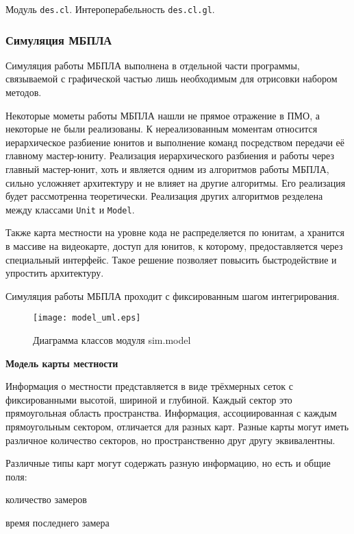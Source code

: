 Модуль \verb|des.cl|. Интероперабельность \verb|des.cl.gl|.

\newpage
\subsubsection{Симуляция МБПЛА}

Симуляция работы МБПЛА выполнена в отдельной части программы,
связываемой с графической частью лишь необходимым для отрисовки
набором методов.

Некоторые мометы работы МБПЛА нашли не прямое отражение в ПМО,
а некоторые не были реализованы. К нереализованным моментам относится
иерархическое разбиение юнитов и выполнение команд посредством передачи
её главному мастер-юниту. Реализация иерархического разбиения и
работы через главный мастер-юнит, хоть и является одним из алгоритмов
работы МБПЛА, сильно усложняет архитектуру и не влияет на другие
алгоритмы. Его реализация будет рассмотренна теоретически.
Реализация других алгоритмов резделена между классами \verb|Unit|
и \verb|Model|.

Также карта местности на уровне кода не распределяется по юнитам,
а хранится в массиве на видеокарте, доступ для юнитов, к которому,
предоставляется через специальный интерфейс. Такое решение позволяет
повысить быстродействие и упростить архитектуру.

Симуляция работы МБПЛА проходит с фиксированным шагом интегрирования.

\begin{figure}[h!]
    \centering
    \texttt{[image: model\_uml.eps]}
    \caption{Диаграмма классов модуля sim.model}
\end{figure}

\clearpage
\newpage

\textbf{Модель карты местности}

Информация о местности представляется в виде трёхмерных сеток с фиксированными
высотой, шириной и глубиной. Каждый сектор это прямоугольная область пространства.
Информация, ассоциированная с каждым прямоугольным сектором, отличается для разных
карт. Разные карты могут иметь различное количество секторов, но пространственно
друг другу эквивалентны.

Различные типы карт могут содержать разную информацию, но есть и общие поля:

\begin{mintemize}
\item количество замеров
\item время последнего замера
\end{mintemize}

